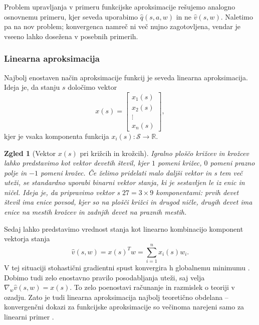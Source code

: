 \documentclass[12pt,a4paper]{amsart}
\theoremstyle{definition} %
\theoremstyle{plain} %
\newtheorem{zgled}[definicija]{Zgled}
\newcommand{\R}{\mathbb R}
\begin{document}
Problem upravljanja v primeru funkcijske aproksimacije rešujemo analogno osnovnemu primeru, kjer seveda 
uporabimo $\hat{q}(s, a, w)$ in ne $\hat{v}(s, w)$. Naletimo pa na nov problem; konvergenca namreč ni 
več nujno zagotovljena, vendar je vseeno lahko dosežena v posebnih primerih.

\subsubsection{Linearna aproksimacija}
Najbolj enostaven način aproksimacije funkcij je seveda linearna aproksimacija. Ideja je, da stanju 
$s$ določimo vektor 
$$
x(s) = \begin{bmatrix}
    x_{1}(s) \\
    x_{2}(s) \\
    \vdots \\
    x_{n}(s)
  \end{bmatrix},
$$
kjer je vsaka komponenta funkcija $x_i(s): \mathcal{S} \rightarrow \R$.

\begin{zgled}[Vektor $x(s)$ pri križcih in krožcih]
\label{vektor-ttt}
    Igralno ploščo križcev in krožcev lahko predstavimo kot vektor devetih števil, kjer 
    $1$ pomeni križec, $0$ pomeni prazno polje in $-1$ pomeni krožec. Če želimo pridelati malo daljši 
    vektor in s tem več uteži, se standardno uporabi binarni vektor stanja, ki je sestavljen le iz enic 
    in ničel. Ideja je, da pripravimo vektor s $27 = 3 \times 9$ komponentami: prvih 
    devet števil ima enice povsod, kjer so na plošči križci in drugod ničle, drugih devet ima enice na 
    mestih krožcev in zadnjih devet na praznih mestih.
\end{zgled}

Sedaj lahko predstavimo vrednost stanja kot linearno kombinacijo komponent vektorja stanja
$$
\hat{v}(s, w) = x(s)^T w = \sum_{i=1}^n x_i(s) w_i.
$$
V tej situaciji stohastični gradientni spust konvergira h globalnemu minimumu \cite{RLintro}. Dobimo 
tudi zelo enostavno pravilo posodabljanja uteži, saj velja $\nabla_w \hat{v}(s, w) = x(s)$. To zelo 
poenostavi računanje in razmislek o teoriji v ozadju. Zato je tudi linearna aproksimacija najbolj 
teoretično obdelana -- konvergenčni dokazi za funkcijske aproksimacije so večinoma narejeni samo 
za linearni primer \cite{RLalgo}.
\end{document}
